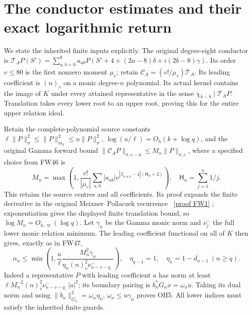 \documentclass[11pt]{article}
\begin{document}
\section{The conductor estimates and their exact logarithmic return}
We state the inherited finite inputs explicitly. The original degree-eight
conductor is
$\mathcal T_AP(S')=\sum_{a,b=0}^8a_{ab}P(S'+4+(2a-8)\delta+i(2b-8)\gamma)$.
Its order $v\le80$ is the first nonzero moment $\mu_v$; retain
$\mathcal C_A=(v!/\mu_v)\mathcal T_A$. Its leading coefficient is
$(n)_v$ on a monic degree-$n$ polynomial. Its actual kernel contains
the image of $K$ under every attained representative in the sense
$\chi_{k-8}\mid\mathcal T_AP$. Translation takes every lower root to
an upper root, proving this for the entire upper relation ideal.

Retain the complete-polynomial source constants
$\ell\|P\|_\sigma^2\le\|P\|_{m_k}^2\le u\|P\|_\sigma^2$,
$\log(u/\ell)=O_h(k+\log q)$, and the original Gamma forward bound
$\|\mathcal C_AP\|_{\sigma,c-4}\le M_n\|P\|_{\sigma,c}$, where a
specified choice from FW46 is
\[
 M_n=\max\left(1,\frac{v!}{|\mu_v|}\sum_{a,b}|a_{ab}|
  e^{|\beta_{8,a,b}-4|(\mathsf H_n+2)}\right),\quad
 \mathsf H_n=\sum_{j=1}^n1/j.
\]
This retains the source centres and all coefficients. Its proof expands
the finite derivative in the original Meixner--Pollaczek recurrence
\cite{DLMF,FW}%
~\href{https://github.com/KokunoYumeto/zeta-function-research-reader/blob/5992ad50c0f2a06921f1fcaded7b4e38097c0739/workbenches/splitzero-tandem/continuations/20260920-original-kernel-mixed-determinants/providers/FULL_WINDOW_SOURCE_PRODUCTS.tex\#L28}{[proof FW1]}%
{}; exponentiation gives the displayed finite translation
bound, so $\log M_n=O_{h,\varpi}(\log q)$.
Let $\gamma_n$ be the Gamma monic norm and $\nu^-_j$ the full lower
monic relation minimum. The leading coefficient functional on all of
$K$ then gives, exactly as in FW47,
\begin{equation}\tag{OH5}
 \alpha_n\le\min\left(1,\frac u\ell
 \frac{M_n^2\gamma_n}{\eta_n(n)_v^2\nu^-_{n-v-q_-}}\right),\quad
 \eta_{q-1}=1,\quad \eta_n=1-d_{n-1}\ (n\ge q).
\end{equation}
Indeed a representative $P$ with leading coefficient $a$ has norm at
least $\ell M_n^{-2}(n)_v^2\nu^-_{n-v-q_-}|a|^2$; its boundary
pairing is $b_n^*G_nx=\omega_na$. Taking its dual norm and using
$\|b_n\|_{G_n}^2=\omega_n\eta_n$, $\omega_n\le u\gamma_n$ proves
OH5. All lower indices must satisfy the inherited finite guards.
\end{document}
